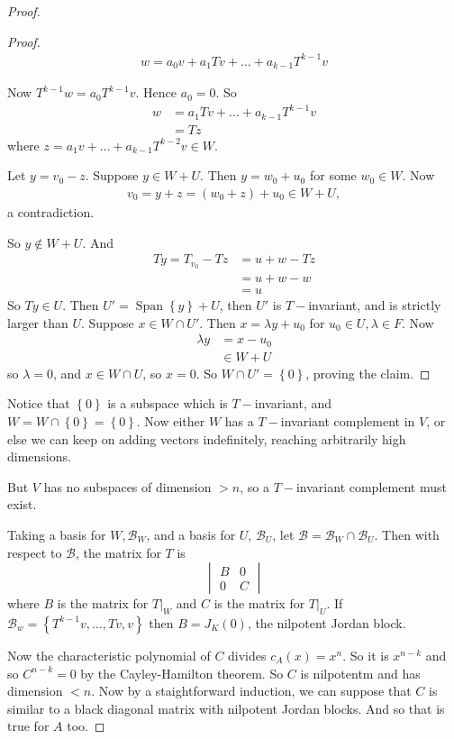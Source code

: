 \documentclass{article}
\theoremstyle{definition} \newtheorem*{definition}{Definition}
\DeclareMathOperator{\Span}{Span}
\begin{document}
\begin{proof}
\begin{proof}
    \begin{align*}
      w = a_0v  + a_1Tv + \dots + a_{k-1}T^{k-1}v
    \end{align*}

    Now $T^{k-1}w = a_0T^{k-1}v$. Hence $a_0=0$. So
    \begin{align*}
      w &= a_1Tv + \dots + a_{k-1}T^{k-1}v\\
      &= Tz
    \end{align*}
    where $z = a_1v+\dots+a_{k-1}T^{k-2}v \in W$.

    Let $y = v_0-z$. Suppose $y \in W+U$. Then $y=w_0+u_0$ for some
    $w_0 \in W$. Now
    \begin{align*}
      v_0 = y+z=(w_0+z)+u_0 \in W + U,
    \end{align*}
    a contradiction.

    So $y \not\in W+U$. And 
    \begin{align*}
      Ty = T_{v_0}-Tz &= u+w-Tz\\
      &= u+w-w\\
      &= u
    \end{align*}
    So $Ty \in U$. Then  $U' = \Span\left\{ y \right\}+U$, then
    $U'$ is $T-$invariant, and is strictly larger than $U$. Suppose
    $x \in W\cap U'$. Then $x=\lambda y + u_0$ for $u_0 \in U,\lambda \in
    F$. Now
    \begin{align*}
      \lambda y &= x - u_0\\
      &\in W+U
    \end{align*}
    so $\lambda=0$, and $x\in W \cap U$, so $x=0$. So $W \cap U' = 
    \left\{ 0 \right\}$, proving the claim.
  \end{proof}
  Notice that $\left\{ 0 \right\}$ is a subspace which is $T-$invariant,
  and $W = W\cap\left\{ 0 \right\}=\left\{ 0 \right\}$. Now either
  $W$ has a $T-$invariant complement in $V$, or else we can keep
  on adding vectors indefinitely, reaching arbitrarily high dimensions.

  But $V$ has no subspaces of dimension $>n$, so a $T-$invariant 
  complement must exist.

  Taking a  basis for $W, \mathcal{B}_W$, and a basis for $U$, 
  $\mathcal{B}_U$, let $\mathcal{B}=\mathcal{B}_W \cap \mathcal{B}_U$.
  Then with respect to $\mathcal{B}$, the matrix for $T$ is
  \[
    \begin{vmatrix}
      B  & 0\\
      0 & C
    \end{vmatrix}
  \]
  where $B$ is the matrix for $T|_W$ and $C$ is the matrix for $T|_U$.
  If $\mathcal{B}_w = \left\{ T^{k-1}v,\dots,Tv,v \right\}$ then
  $B=J_K(0)$, the nilpotent Jordan block.

  Now the characteristic polynomial of $C$ divides $c_A(x)=x^n$. So 
  it is $x^{n-k}$ and so $C^{n-k}=0$ by the Cayley-Hamilton theorem.
  So $C$ is nilpotentm and has dimension $<n$. Now by a staightforward
  induction, we can suppose that $C$ is similar to a black diagonal 
  matrix with nilpotent Jordan blocks. And so that is true for $A$ too.
\end{proof}
\end{document}
